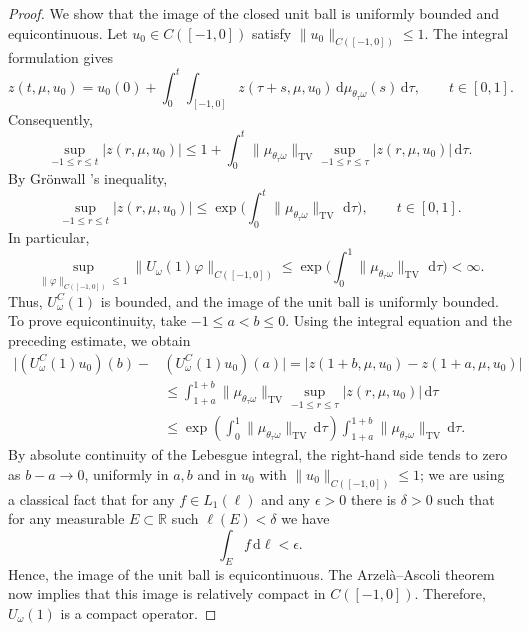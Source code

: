 \documentclass[reqno]{amsart}
\theoremstyle{plain}
\numberwithin{equation}{section}
\numberwithin{definition}{section}
\newcommand\RR{\ensuremath{\mathbb{R}}}
\newcommand{\dd}{\ensuremath{\mathrm{d}}}
\begin{document}
\begin{proof}
We show that the image of the
closed unit ball is uniformly bounded and equicontinuous. Let $u_0\in C([-1,0])$ satisfy
$\|u_0\|_{C{([-1,0])}}\le 1$. The integral formulation gives
\begin{equation*}
       z(t,\mu,u_0)
    =
    u_0(0)
    +
    \int_0^t\int_{[-1,0]}
    z(\tau+s,\mu,u_0)\,
    \dd\mu_{\theta_\tau\omega}(s)\,\dd\tau,
    \qquad t\in[0,1].
\end{equation*}
Consequently,
\begin{equation*}
        \sup_{-1\le r\le t}|z(r,\mu,u_0)|
    \le
    1+
    \int_0^t
    \|\mu_{\theta_\tau\omega}\|_{\mathrm{TV}}
    \sup_{-1\le r\le\tau}|z(r,\mu,u_0)|\,\dd\tau.
\end{equation*}
By Gr{\"o}nwall 's inequality,
\begin{equation*}
       \sup_{-1\le r\le t}|z(r,\mu,u_0)|\le\exp\!\Big(\int_0^t\|\mu_{\theta_\tau\omega}\|_{\mathrm{TV}}\,\,\dd\tau
    \Big),
    \qquad t\in[0,1].
\end{equation*}
In particular,
\begin{equation*}
\sup_{\|\varphi\|_{C([-1,0])}\le1}\|U_\omega(1)\varphi\|_{C([-1,0])}\le\exp\!\Big(\int_0^1\|\mu_{\theta_\tau\omega}\|_{\mathrm{TV}}\,\,\dd\tau
    \Big)
    <\infty.
\end{equation*}
Thus, $U^C_\omega(1)$ is bounded, and the image of the unit
ball is uniformly bounded. To prove equicontinuity, take $-1\le a<b\le0$.
Using the integral equation and the preceding estimate,
we obtain
\begin{equation*}
    \begin{split}
    \bigl|
    (U^C_\omega(1)u_0)(b)
        -& (U^C_\omega(1)u_0)(a)
    \bigr|
     =
    \bigl|z(1+b,\mu,u_0)-z(1+a,\mu,u_0)\bigr|\\
    & \le
    \int_{1+a}^{1+b} \|\mu_{\theta_\tau\omega}\|_{\mathrm{TV}}
    \sup_{-1\le r\le\tau}|z(r,\mu,u_0)|\,\dd\tau\\
    & \le
    \exp\!\left( \int_0^1\|\mu_{\theta_\tau\omega}\|_{\mathrm{TV}}\,\dd\tau
    \right)
    \int_{1+a}^{1+b} \|\mu_{\theta_\tau\omega}\|_{\mathrm{TV}}\,\dd\tau.
    \end{split}
\end{equation*}
By absolute continuity of the Lebesgue integral, the
right-hand side tends to zero as $b-a\to0$, uniformly
in $a,b$ and in $u_0$ with $\| u_0\|_{C([-1,0])}\le1$; we are using a classical fact that for any $f\in L_1(\ell)$ and any $\epsilon>0$ there is $\delta>0$ such that for any measurable $E\subset \RR$ such $\ell(E)<\delta$ we have 
\begin{equation*}
    \int_E f\,\dd \ell < \epsilon.
\end{equation*}
Hence, the image of the unit ball is equicontinuous. The Arzel\`a--Ascoli theorem now implies that this image
is relatively compact in $C([-1,0])$. Therefore, $U_\omega(1)$ is a compact operator.
\end{proof}
\end{document}
